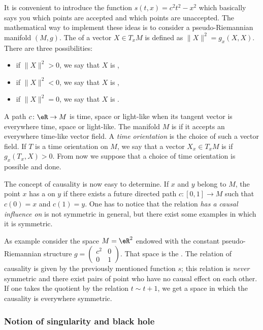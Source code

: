 It is convenient to introduce the function $s(t,x)=c^2t^2-x^2$ which basically says you which points are accepted and which points are unaccepted. The mathematical way to implement these ideas is to consider a pseudo-Riemannian manifold $(M,g)$. The  of a vector $X\in T_xM$ is defined as $\| X \|^2=g_x(X,X)$. There are three possibilities:
\begin{itemize}\label{PgDefsGenre}
	\item if $\| X \|^2>0$, we say that $X$ is ,
	\item if $\| X \|^2<0$, we say that $X$ is ,
	\item if $\| X \|^2=0$, we say that $X$ is .
\end{itemize}
A path $c\colon \eR\to M$ is time, space or light-like when its tangent vector is everywhere time, space or light-like. The manifold $M$ is  if it accepts an everywhere time-like vector field. A \emph{time orientation} is the choice of such a vector field. If $T$ is a time orientation on $M$, we say that a vector $X_x\in T_xM$ is  if $g_x(T_x,X)>0$. From now we suppose that a choice of time orientation is possible and done.

The concept of causality is now easy to determine. If $x$ and $y$ belong to $M$, the point $x$ has a  on $y$ if there exists a future directed path $c\colon [0,1]\to M$ such that $c(0)=x$ and $c(1)=y$. One has to notice that the relation \emph{has a causal influence on} is not symmetric in general, but there exist some examples in which it is symmetric.

As example consider the space $M=\eR^2$ endowed with the constant pseudo-Riemannian structure $g=\begin{pmatrix}c^2&0\\0&1 \end{pmatrix}$. That space is the . The relation of causality is given by the previously mentioned function $s$; this relation is \emph{never} symmetric and there exist pairs of point who have no causal effect on each other. If one takes the quotient by the relation $t\sim t+1$, we get a space in which the causality is everywhere symmetric.

\subsubsection{Notion of singularity and black hole}

